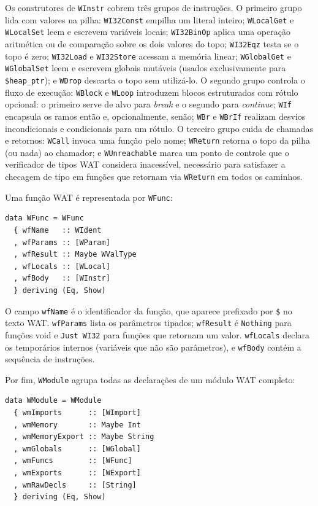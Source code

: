 Os construtores de \texttt{WInstr} cobrem três grupos de instruções.
O primeiro grupo lida com valores na pilha: \texttt{WI32Const} empilha um
literal inteiro; \texttt{WLocalGet} e \texttt{WLocalSet} leem e escrevem
variáveis locais; \texttt{WI32BinOp} aplica uma operação aritmética ou de
comparação sobre os dois valores do topo; \texttt{WI32Eqz} testa se o topo é
zero; \texttt{WI32Load} e \texttt{WI32Store} acessam a memória linear;
\texttt{WGlobalGet} e \texttt{WGlobalSet} leem e escrevem globais mutáveis
(usados exclusivamente para \texttt{\$heap\_ptr}); e \texttt{WDrop} descarta
o topo sem utilizá-lo.
O segundo grupo controla o fluxo de execução: \texttt{WBlock} e \texttt{WLoop}
introduzem blocos estruturados com rótulo opcional: o primeiro serve de alvo
para \emph{break} e o segundo para \emph{continue}; \texttt{WIf} encapsula os
ramos então e, opcionalmente, senão; \texttt{WBr} e \texttt{WBrIf} realizam
desvios incondicionais e condicionais para um rótulo.
O terceiro grupo cuida de chamadas e retornos: \texttt{WCall} invoca uma
função pelo nome; \texttt{WReturn} retorna o topo da pilha (ou nada) ao
chamador; e \texttt{WUnreachable} marca um ponto de controle que o verificador
de tipos WAT considera inacessível, necessário para satisfazer a checagem de
tipo em funções que retornam via \texttt{WReturn} em todos os caminhos.

Uma função WAT é representada por \texttt{WFunc}:

\begin{verbatim}
data WFunc = WFunc
  { wfName   :: WIdent
  , wfParams :: [WParam]
  , wfResult :: Maybe WValType
  , wfLocals :: [WLocal]
  , wfBody   :: [WInstr]
  } deriving (Eq, Show)
\end{verbatim}

O campo \texttt{wfName} é o identificador da função, que aparece prefixado por
\texttt{\$} no texto WAT.  \texttt{wfParams} lista os parâmetros tipados;
\texttt{wfResult} é \texttt{Nothing} para funções void e \texttt{Just WI32}
para funções que retornam um valor.  \texttt{wfLocals} declara os temporários
internos (variáveis que não são parâmetros), e \texttt{wfBody} contém a
sequência de instruções.

Por fim, \texttt{WModule} agrupa todas as declarações de um módulo WAT
completo:

\begin{verbatim}
data WModule = WModule
  { wmImports      :: [WImport]
  , wmMemory       :: Maybe Int
  , wmMemoryExport :: Maybe String
  , wmGlobals      :: [WGlobal]
  , wmFuncs        :: [WFunc]
  , wmExports      :: [WExport]
  , wmRawDecls     :: [String]
  } deriving (Eq, Show)
\end{verbatim}

